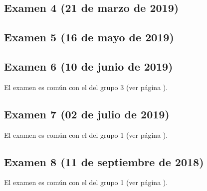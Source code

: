 \documentclass[a4paper,12pt,twoside]{book}
\begin{document}
\subsection{Examen 4 (21 de marzo de 2019)}
\subsection{Examen 5 (16 de mayo de 2019)}
\subsection{Examen 6 (10 de junio de 2019)}
El examen es común con el del grupo 3 (ver página \pageref{examen_18_19_3_6}).
\subsection{Examen 7 (02 de julio de 2019)}
El examen es común con el del grupo 1 (ver página \pageref{examen_18_19_1_7}).
\subsection{Examen 8 (11 de septiembre de 2018)}
El examen es común con el del grupo 1 (ver página \pageref{examen_18_19_1_8}).
\end{document}
